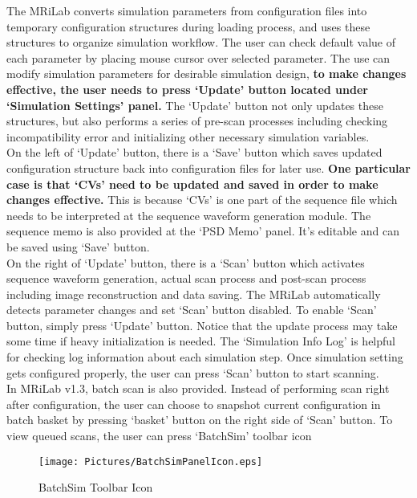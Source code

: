 \documentclass{book}%
\begin{document}
The MRiLab converts simulation parameters from configuration files into temporary configuration structures during loading process, and uses these structures to organize simulation workflow. The user can check default value of each parameter by placing mouse cursor over selected parameter. The use can modify simulation parameters for desirable simulation design, \textbf{to make changes effective, the user needs to press `Update' button located under `Simulation Settings' panel.} The `Update' button not only updates these structures, but also performs a series of pre-scan processes including checking incompatibility error and initializing other necessary simulation variables. \\

On the left of `Update' button, there is a `Save' button which saves updated configuration structure back into configuration files for later use. \textbf{One particular case is that `CVs' need to be updated and saved in order to make changes effective.} This is because `CVs' is one part of the sequence file which needs to be interpreted at the sequence waveform generation module. The sequence memo is also provided at the `PSD Memo' panel. It's editable and can be saved using `Save' button. \\

On the right of `Update' button, there is a `Scan' button which activates sequence waveform generation, actual scan process and post-scan process including image reconstruction and data saving. The MRiLab automatically detects parameter changes and set `Scan' button disabled. To enable `Scan' button, simply press `Update' button. Notice that the update process may take some time if heavy initialization is needed. The `Simulation Info Log' is helpful for checking log information about each simulation step. Once simulation setting gets configured properly, the user can press `Scan' button to start scanning.\\

In MRiLab v1.3, batch scan is also provided. Instead of performing scan right after configuration, the user can choose to snapshot current configuration in batch basket by pressing `basket' button on the right side of `Scan' button. To view queued scans, the user can press `BatchSim' toolbar icon \\

\begin{figure}[htbp]
	\centering
		\texttt{[image: Pictures/BatchSimPanelIcon.eps]}
	\caption{BatchSim Toolbar Icon}
	\label{fig:BatchSimPanelIcon}
\end{figure}
\end{document}
